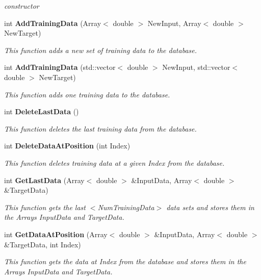 \begin{CompactItemize}
\begin{CompactList}\small\item\em constructor\item\end{CompactList}\item 
int {\bf Add\-Training\-Data} (Array$<$ double $>$ New\-Input, Array$<$ double $>$ New\-Target)
\begin{CompactList}\small\item\em This function adds a new set of training data to the database.\item\end{CompactList}\item 
int {\bf Add\-Training\-Data} (std::vector$<$ double $>$ New\-Input, std::vector$<$ double $>$ New\-Target)
\begin{CompactList}\small\item\em This function adds one training data to the database.\item\end{CompactList}\item 
int {\bf Delete\-Last\-Data} ()
\begin{CompactList}\small\item\em This function deletes the last training data from the database.\item\end{CompactList}\item 
int {\bf Delete\-Data\-At\-Position} (int Index)
\begin{CompactList}\small\item\em This function deletes training data at a given Index from the database.\item\end{CompactList}\item 
int {\bf Get\-Last\-Data} (Array$<$ double $>$ \&Input\-Data, Array$<$ double $>$ \&Target\-Data)
\begin{CompactList}\small\item\em This function gets the last $<$Num\-Training\-Data$>$ data sets and stores them in the Arrays Input\-Data and Target\-Data.\item\end{CompactList}\item 
int {\bf Get\-Data\-At\-Position} (Array$<$ double $>$ \&Input\-Data, Array$<$ double $>$ \&Target\-Data, int Index)
\begin{CompactList}\small\item\em This function gets the data at Index from the database and stores them in the Arrays Input\-Data and Target\-Data.\item\end{CompactList}\item 

\end{CompactItemize}
